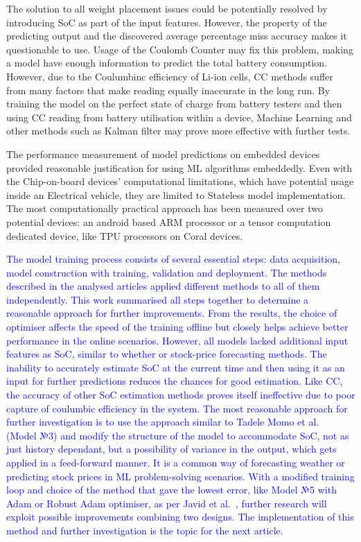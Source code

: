 %
%
The solution to all weight placement issues could be potentially resolved by introducing SoC as part of the input features.
However, the property of the predicting output and the discovered average percentage miss accuracy makes it questionable to use.
Usage of the Coulomb Counter may fix this problem, making a model have enough information to predict the total battery consumption.
However, due to the Coulumbinc efficiency of Li-ion cells, CC methods suffer from many factors that make reading equally inaccurate in the long run.
By training the model on the perfect state of charge from battery testers and then using CC reading from battery utilisation within a device, Machine Learning and other methods such as Kalman filter may prove more effective with further tests.

%
%
The performance measurement of model predictions on embedded devices provided reasonable justification for using ML algorithms embeddedly.
Even with the Chip-on-board devices' computational limitations, which have potential usage inside an Electrical vehicle, they are limited to Stateless model implementation.
The most computationally practical approach has been measured over two potential devices: an android based ARM processor or a tensor computation dedicated device, like TPU processors on Coral devices.

%
\textcolor{blue}{The model training process consists of several essential steps: data acquisition, model construction with training, validation and deployment.
The methods described in the analysed articles applied different methods to all of them independently.
This work summarised all steps together to determine a reasonable approach for further improvements.
From the results, the choice of optimiser affects the speed of the training offline but closely helps achieve better performance in the online scenarios.
However, all models lacked additional input features as SoC, similar to whether or stock-price forecasting methods.
The inability to accurately estimate SoC at the current time and then using it as an input for further predictions reduces the chances for good estimation.
Like CC, the accuracy of other SoC estimation methods proves itself ineffective due to poor capture of coulumbic efficiency in the system.
The most reasonable approach for further investigation is to use the approach similar to Tadele Momo et al.~\cite{mamo_long_2020} (Model №3) and modify the structure of the model to accommodate SoC, not as just history dependant, but a possibility of variance in the output, which gets applied in a feed-forward manner. 
It is a common way of forecasting weather or predicting stock prices in ML problem-solving scenarios.
With a modified training loop and choice of the method that gave the lowest error, like Model №5 with Adam or Robust Adam optimiser, as per Javid et al.~\cite{javid_adaptive_2020}, further research will exploit possible improvements combining two designs.
The implementation of this method and further investigation is the topic for the next article.
}